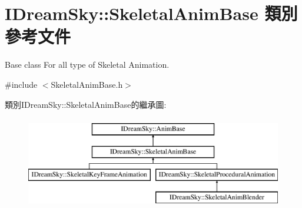 \hypertarget{class_i_dream_sky_1_1_skeletal_anim_base}{}\section{I\+Dream\+Sky\+:\+:Skeletal\+Anim\+Base 類別 參考文件}
\label{class_i_dream_sky_1_1_skeletal_anim_base}


Base class For all type of Skeletal Animation.  




{\ttfamily \#include $<$Skeletal\+Anim\+Base.\+h$>$}

類別\+I\+Dream\+Sky\+:\+:Skeletal\+Anim\+Base的繼承圖\+:\begin{figure}[H]
\begin{center}
\leavevmode
\includegraphics[height=4.000000cm]{class_i_dream_sky_1_1_skeletal_anim_base}
\end{center}
\end{figure}
